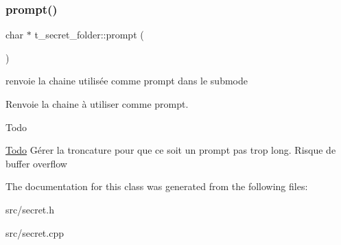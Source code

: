\subsubsection{\texorpdfstring{prompt()}{prompt()}}
{\footnotesize\ttfamily char $\ast$ t\+\_\+secret\+\_\+folder\+::prompt (\begin{DoxyParamCaption}{ }\end{DoxyParamCaption})}



renvoie la chaine utilisée comme prompt dans le submode 

Renvoie la chaine à utiliser comme prompt.

\begin{DoxyRefDesc}{Todo}
\item[\hyperlink{todo__todo000013}{Todo}]Gérer la troncature pour que ce soit un prompt pas trop long. Risque de buffer overflow \end{DoxyRefDesc}


The documentation for this class was generated from the following files\+:\begin{DoxyCompactItemize}
\item 
src/secret.\+h\item 
src/secret.\+cpp\end{DoxyCompactItemize}
